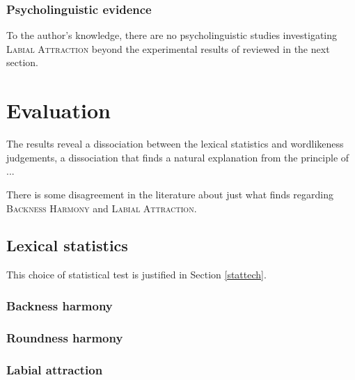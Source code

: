 \subsubsection{Psycholinguistic evidence}

To the author's knowledge, there are no psycholinguistic studies investigating \textsc{Labial Attraction} beyond the experimental results of \citet{Zimmer1969} reviewed in the next section. 

\section{Evaluation}

The results reveal a dissociation between the lexical statistics and wordlikeness judgements, a dissociation that finds a natural explanation from the principle of ...

There is some disagreement in the literature about just what \citet{Zimmer1969} finds regarding \textsc{Backness Harmony} and \textsc{Labial Attraction}.

\subsection{Lexical statistics}
\label{lexstats}

This choice of statistical test is justified in Section \ref{stattech}.

\subsubsection{Backness harmony}

\subsubsection{Roundness harmony}



\subsubsection{Labial attraction}

